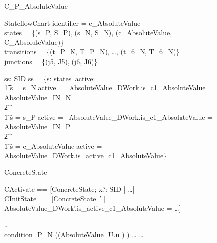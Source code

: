 \documentclass[submission]{eptcs}
\begin{document}
\begin{figure}
\centering
\hspace{-.8cm}
\begin{minipage}{\textwidth}
\begin{circus}
\circprocess C\_P\_AbsoluteValue \circdef \circbegin\\
\end{circus}
\vspace{-1.4cm}
\begin{axdef}
StateflowChart
\where
identifier = c\_AbsoluteValue\\
states = \{(s\_P, S\_P), (s\_N, S\_N), (c\_AbsoluteValue, C\_AbsoluteValue)\}\\
transitions = \{(t\_P\_N, T\_P\_N),  \ldots, (t\_6\_N, T\_6\_N)\}\\
junctions = \{(j5, J5), (j6, J6)\}
\end{axdef}
\vspace{-1cm}
\begin{axdef}
ss: SID \pfun \boolean
\where
ss = \{s: \dom states; active: \boolean \circspot\\\t1
s = s\_N \land active = \IF~AbsoluteValue\_DWork.is\_c1\_AbsoluteValue = AbsoluteValue\_IN\_N\\
\t2 \THEN~\true \ELSE~\false \lor\\\t1
s = s\_P \land active = \IF~AbsoluteValue\_DWork.is\_c1\_AbsoluteValue = AbsoluteValue\_IN\_P\\
\t2 \THEN~\true \ELSE~\false\lor\\\t1
s = c\_AbsoluteValue \land active = AbsoluteValue\_DWork.is\_active\_c1\_AbsoluteValue\}
\end{axdef}
\vspace{-1cm}
\begin{circusaction}
\circstate ConcreteState
\end{circusaction}
\vspace{-1.1cm}
\begin{zed}
CActivate == [\Delta ConcreteState; x?: SID | \ldots]\\
CInitState == [ConcreteState~' | AbsoluteValue\_DWork'.is\_active\_c1\_AbsoluteValue = \false \land \ldots]\\
\end{zed}
\vspace{-1.5cm}
\begin{circusaction}
\ldots\\
condition\_P\_N \circdef \circif ((AbsoluteValue\_U.u ) ) \circthen \ldots
\ldots\\

\end{circusaction}
\end{minipage}
\end{figure}
\end{document}
